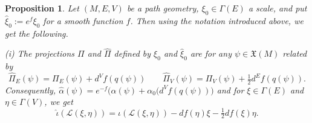 \documentclass[11pt]{amsart}
\newtheorem{proposition}{Proposition}
\numberwithin{proposition}{section}
\numberwithin{equation}{section}
\begin{document}
\begin{proposition}\label{prop:Weyl-transf}
Let $(M,E,V)$ be a path geometry, $\xi_0\in\Gamma(E)$ a scale, and put $\hat\xi_0:=e^f\xi_0$ for a smooth function $f$. Then using the notation introduced above, we get the following. 

(i) The projections $\Pi$ and $\hat\Pi$ defined by $\xi_0$ and $\hat\xi_0$ are for any $\psi\in\mathfrak X(M)$ related by
\begin{equation}\label{eq:Pi-trans}
        \hat\Pi_E(\psi)=\Pi_E(\psi)+d^Vf(q(\psi)) \qquad \hat\Pi_V(\psi)=\Pi_V(\psi)+\tfrac12d^Ef(q(\psi)). 
\end{equation}
Consequently, $\hat\alpha(\psi)=e^{-f}\big(\alpha(\psi)+\alpha_0(d^Vf(q(\psi))\big)$ and for $\xi\in\Gamma(E)$ and $\eta\in\Gamma(V)$, we get \begin{equation}\label{hat-zeta}
 \hat\iota(\mathcal L(\xi,\eta))=\iota(\mathcal{L}(\xi,\eta))-df(\eta)\xi-\tfrac12 df(\xi)\eta.   
\end{equation}  


\end{proposition}
\end{document}
